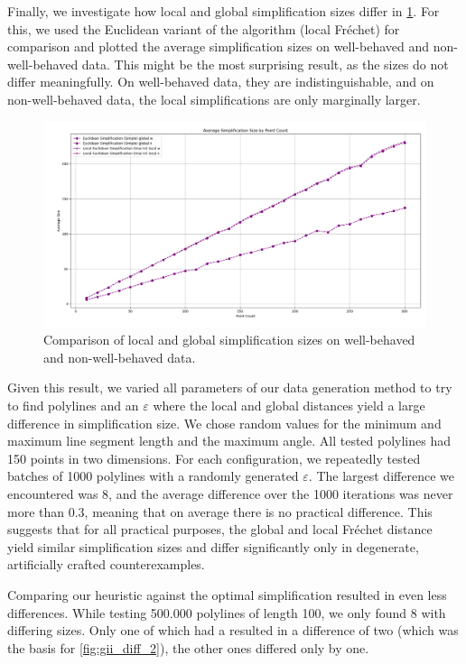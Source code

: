 Finally, we investigate how local and global simplification sizes differ in \cref{fig:res-local-global}. For this, we used the Euclidean variant of the \citeauthor{computational_geometric_methods_for_polygonal_approximations_of_a_curve} algorithm (local Fréchet) for comparison and plotted the average simplification sizes on well-behaved and non-well-behaved data. This might be the most surprising result, as the sizes do not differ meaningfully. On well-behaved data, they are indistinguishable, and on non-well-behaved data, the local simplifications are only marginally larger.

\begin{figure}[b]
  \centering
	\includegraphics[scale=0.4]{./figures/res_local_global.png}
  \caption{Comparison of local and global simplification sizes on well-behaved and non-well-behaved data.}
  \label{fig:res-local-global}
\end{figure}

Given this result, we varied all parameters of our data generation method to try to find polylines and an \(\varepsilon\) where the local and global distances yield a large difference in simplification size. We chose random values for the minimum and maximum line segment length and the maximum angle. All tested polylines had 150 points in two dimensions. For each configuration, we repeatedly tested batches of 1000 polylines with a randomly generated \(\varepsilon\). The largest difference we encountered was 8, and the average difference over the 1000 iterations was never more than 0.3, meaning that on average there is no practical difference. This suggests that for all practical purposes, the global and local Fréchet distance yield similar simplification sizes and differ significantly only in degenerate, artificially crafted counterexamples.

Comparing our heuristic against the optimal simplification resulted in even less differences. While testing 500.000 polylines of length 100, we only found 8 with differing sizes. Only one of which had a resulted in a difference of two (which was the basis for \cref{fig:gii_diff_2}), the other ones differed only by one. 

